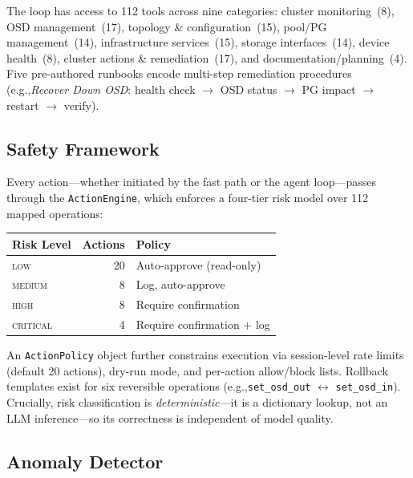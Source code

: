 \documentclass[sigplan,nonacm,10pt]{acmart}
\newcommand{\eg}{e.g.,\xspace}
\begin{document}
The loop has access to 112 tools across nine categories: cluster
monitoring~(8), OSD management~(17), topology \& configuration~(15),
pool/PG management~(14), infrastructure services~(15), storage
interfaces~(14), device health~(8), cluster actions \&
remediation~(17), and documentation/planning~(4).
Five pre-authored runbooks encode multi-step remediation procedures
(\eg \emph{Recover Down OSD}: health check $\to$ OSD status $\to$
PG impact $\to$ restart $\to$ verify).

\subsection{Safety Framework}\label{ss:safety}

Every action---whether initiated by the fast path or the agent
loop---passes through the \texttt{ActionEngine}, which enforces a
four-tier risk model over 112 mapped operations:

\begin{center}
\small
\begin{tabular}{@{}lrl@{}}
\toprule
\textbf{Risk Level} & \textbf{Actions} & \textbf{Policy} \\
\midrule
\textsc{low}      & 20 & Auto-approve (read-only) \\
\textsc{medium}   &  8 & Log, auto-approve \\
\textsc{high}     &  8 & Require confirmation \\
\textsc{critical} &  4 & Require confirmation + log \\
\bottomrule
\end{tabular}
\end{center}

An \texttt{ActionPolicy} object further constrains execution via
session-level rate limits (default 20 actions), dry-run mode,
and per-action allow/block lists.
Rollback templates exist for six reversible operations
(\eg \texttt{set\_osd\_out} $\leftrightarrow$ \texttt{set\_osd\_in}).
Crucially, risk classification is \emph{deterministic}---it is a
dictionary lookup, not an LLM inference---so its correctness is
independent of model quality.

\subsection{Anomaly Detector}\label{ss:anomaly}
\end{document}
